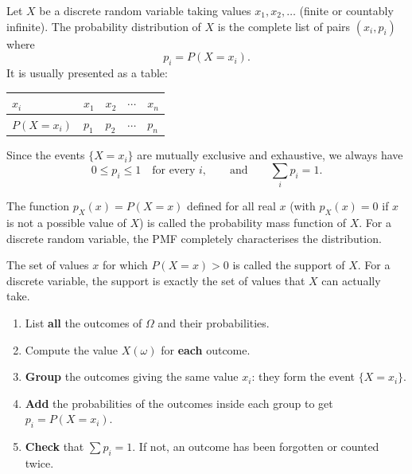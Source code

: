 \documentclass[11pt]{article}
\newcommand{\cle}[1]{{\popxbold\color{popdark}#1}}
\begin{document}
\begin{definition}
Let $X$ be a discrete random variable taking values $x_1, x_2, \ldots$ (finite or countably infinite). The \cle{probability distribution} of $X$ is the complete list of pairs $(x_i, p_i)$ where
\[ p_i = P(X = x_i). \]
It is usually presented as a table:
\begin{center}
\begin{tabularx}{\linewidth}{|l|X|X|X|X|}
\hline
\rowcolor{popblueL} $x_i$ & $x_1$ & $x_2$ & $\cdots$ & $x_n$ \\
\hline
$P(X = x_i)$ & $p_1$ & $p_2$ & $\cdots$ & $p_n$ \\
\hline
\end{tabularx}
\end{center}
Since the events $\{X = x_i\}$ are mutually exclusive and exhaustive, we always have
\[ 0 \le p_i \le 1 \quad \text{for every } i, \qquad \text{and} \qquad \sum_{i} p_i = 1. \]
\end{definition}

\begin{definition}
The function $p_X(x) = P(X = x)$ defined for all real $x$ (with $p_X(x)=0$ if $x$ is not a possible value of $X$) is called the \cle{probability mass function} of $X$. For a discrete random variable, the PMF completely characterises the distribution.
\end{definition}

\begin{aretenir}
The set of values $x$ for which $P(X=x) > 0$ is called the \cle{support} of $X$. For a discrete variable, the support is exactly the set of values that $X$ can actually take.
\end{aretenir}

\begin{methode}
\begin{enumerate}
\item List \textbf{all} the outcomes of $\Omega$ and their probabilities.
\item Compute the value $X(\omega)$ for \textbf{each} outcome.
\item \textbf{Group} the outcomes giving the same value $x_i$: they form the event $\{X = x_i\}$.
\item \textbf{Add} the probabilities of the outcomes inside each group to get $p_i = P(X = x_i)$.
\item \textbf{Check} that $\sum p_i = 1$. If not, an outcome has been forgotten or counted twice.
\end{enumerate}
\end{methode}
\end{document}
